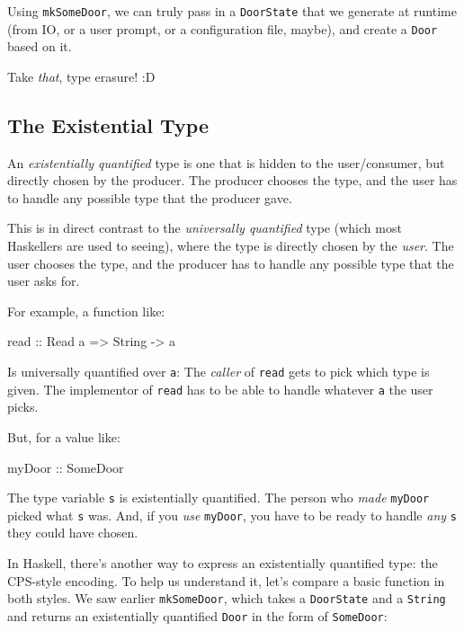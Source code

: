\documentclass[]{article}
\newenvironment{Shaded}{}{}
\newcommand{\DataTypeTok}[1]{\textcolor[rgb]{0.56,0.13,0.00}{#1}}
\newcommand{\OtherTok}[1]{\textcolor[rgb]{0.00,0.44,0.13}{#1}}
\newcommand{\NormalTok}[1]{#1}
\begin{document}
Using \texttt{mkSomeDoor}, we can truly pass in a \texttt{DoorState} that we
generate at runtime (from IO, or a user prompt, or a configuration file, maybe),
and create a \texttt{Door} based on it.

Take \emph{that}, type erasure! :D

\subsection{The Existential Type}\label{the-existential-type}

An \emph{existentially quantified} type is one that is hidden to the
user/consumer, but directly chosen by the producer. The producer chooses the
type, and the user has to handle any possible type that the producer gave.

This is in direct contrast to the \emph{universally quantified} type (which most
Haskellers are used to seeing), where the type is directly chosen by the
\emph{user}. The user chooses the type, and the producer has to handle any
possible type that the user asks for.

For example, a function like:

\begin{Shaded}
\begin{Highlighting}[]
\NormalTok{read}\OtherTok{ ::} \DataTypeTok{Read}\NormalTok{ a }\OtherTok{=>} \DataTypeTok{String} \OtherTok{->}\NormalTok{ a}
\end{Highlighting}
\end{Shaded}

Is universally quantified over \texttt{a}: The \emph{caller} of \texttt{read}
gets to pick which type is given. The implementor of \texttt{read} has to be
able to handle whatever \texttt{a} the user picks.

But, for a value like:

\begin{Shaded}
\begin{Highlighting}[]
\OtherTok{myDoor ::} \DataTypeTok{SomeDoor}
\end{Highlighting}
\end{Shaded}

The type variable \texttt{s} is existentially quantified. The person who
\emph{made} \texttt{myDoor} picked what \texttt{s} was. And, if you \emph{use}
\texttt{myDoor}, you have to be ready to handle \emph{any} \texttt{s} they could
have chosen.

In Haskell, there's another way to express an existentially quantified type: the
CPS-style encoding. To help us understand it, let's compare a basic function in
both styles. We saw earlier \texttt{mkSomeDoor}, which takes a
\texttt{DoorState} and a \texttt{String} and returns an existentially quantified
\texttt{Door} in the form of \texttt{SomeDoor}:
\end{document}

